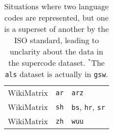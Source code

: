\begin{table}[th!]
\begin{tabular}{lll}
        \midrule
        WikiMatrix        & \texttt{ar}        & \texttt{arz}                              \\
        WikiMatrix        & \texttt{sh}        & \texttt{bs}, \texttt{hr}, \texttt{sr}     \\
        WikiMatrix        & \texttt{zh}        & \texttt{wuu}                              \\
        \bottomrule
    \end{tabular}
    \caption{Situations where two language codes are represented, but one is a superset of another by the ISO standard, leading to unclarity about the data in the supercode dataset. $^{*}$The \texttt{als} dataset is actually in \texttt{gsw}.}
    \label{tab:supersets}
\end{table}


